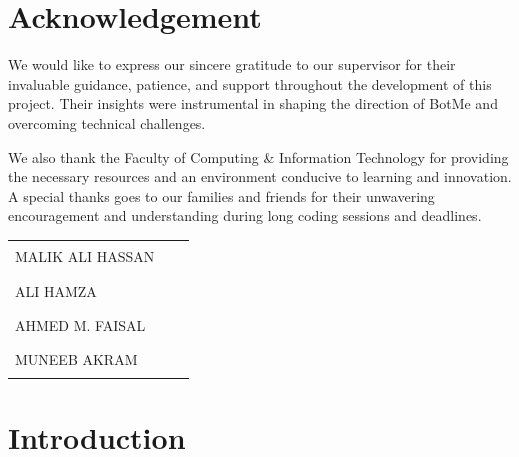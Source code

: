 \documentclass[12pt,a4paper]{report}
\begin{document}
\newpage

\chapter*{Acknowledgement}

We would like to express our sincere gratitude to our supervisor for their invaluable guidance, patience, and support throughout the development of this project. Their insights were instrumental in shaping the direction of BotMe and overcoming technical challenges.

We also thank the Faculty of Computing \& Information Technology for providing the necessary resources and an environment conducive to learning and innovation. A special thanks goes to our families and friends for their unwavering encouragement and understanding during long coding sessions and deadlines.

\vspace{3cm}

\begin{table}[h]
    \centering
    \begin{tabular}{p{6cm} p{1cm} p{6cm}}
        MALIK ALI HASSAN & & \rule{6cm}{0.4pt} \\[0.8cm]
        ALI HAMZA & & \rule{6cm}{0.4pt} \\[0.8cm]
        AHMED M. FAISAL & & \rule{6cm}{0.4pt} \\[0.8cm]
        MUNEEB AKRAM & & \rule{6cm}{0.4pt}
    \end{tabular}
\end{table}

\newpage

\tableofcontents
\newpage

\listoffigures
\newpage

\listoftables
\newpage


\chapter{Introduction}
\end{document}

